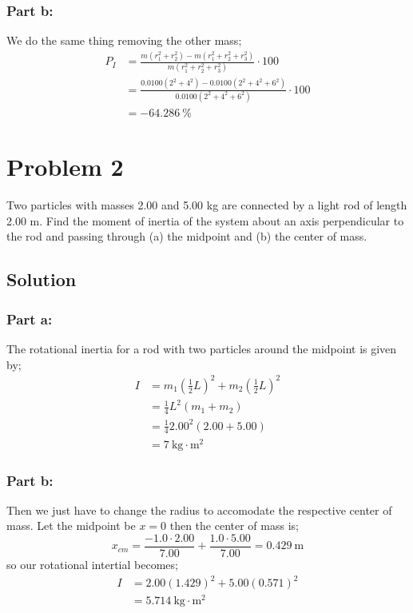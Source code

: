 \documentclass{article}
\begin{document}
\subsubsection*{Part b:}
We do the same thing removing the other mass;
\begin{align*}
	P_I &= \frac{m(r_1^2 + r_2^2) - m(r_1^2 + r_2^2 + r_3^2)}{m(r_1^2 + r_2^2 + r_3^2)} \cdot 100\\
	    &= \frac{0.0100(2^2 + 4^2) - 0.0100(2^2 + 4^2 + 6^2)}{0.0100(2^2 + 4^2 + 6^2)} \cdot 100 \\
	    &= \boxed{-64.286\ \%}
\end{align*}


\section*{Problem 2}
Two particles with masses 2.00 and 5.00 kg are connected by a light rod of length 2.00 m.
Find the moment of inertia of the system about an axis perpendicular to the rod and passing
through (a) the midpoint and (b) the center of mass.

\subsection*{Solution}
\subsubsection*{Part a:}
The rotational inertia for a rod with two particles around the midpoint is given by;
\begin{align*}
	I &= m_1 \left( \frac{1}{2}L \right)^2 + m_2 \left( \frac{1}{2}L \right)^2 \\
	  &= \frac{1}{4}L^2 \left(m_1 + m_2 \right) \\
	  &= \frac{1}{4}2.00^2 \left(2.00 + 5.00 \right) \\
	  &= \boxed{7\ \text{kg} \cdot \text{m}^2}
\end{align*}

\subsubsection*{Part b:}
Then we just have to change the radius to accomodate the respective center of mass. Let the midpoint be $x=0$ then the center of mass is;
\[
	x_{cm} = \frac{-1.0 \cdot 2.00}{7.00} + \frac{1.0 \cdot 5.00}{7.00} = 0.429\ \text{m}
\]
so our rotational intertial becomes;
\begin{align*}
	I &= 2.00 \left( 1.429 \right)^2 + 5.00 \left( 0.571 \right)^2 \\
	  &= \boxed{5.714\ \text{kg} \cdot \text{m}^2}
\end{align*}
\end{document}
